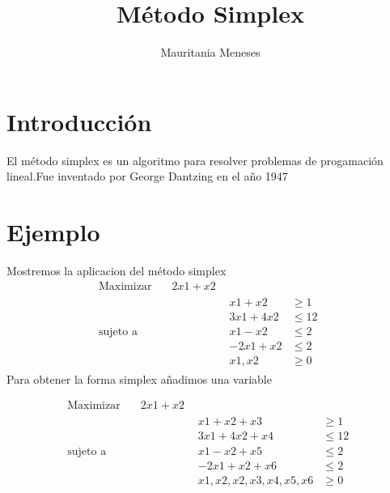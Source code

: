 \documentclass{article}
\title{Método Simplex}
\author{Mauritania Meneses}
\begin{document}
\maketitle

\section{Introducción}
\label{sec:introduccion}

El método simplex es un algoritmo para resolver
problemas de progamación lineal.Fue inventado por George Dantzing en
el año 1947
\section{Ejemplo}

\label{sec:ejemplo}
Mostremos la aplicacion del método simplex
\begin{equation*}
  \begin{aligned}
    \text{Maximizar} \quad & 2x1+x2\\
    
    \text{sujeto a}\quad &
    
    \quad & \begin{aligned}
     x1+x2 & \geq 1\\  
     3x1+4x2 &\leq 12\\
     x1-x2 &\leq 2\\
     -2x1+x2&\leq 2\\
      
      x1,x2 &\geq 0
    \end{aligned}
  \end{aligned}
\end{equation*}
Para obtener la forma simplex añadimos una variable

\begin{equation*}
  \begin{aligned}
    \text{Maximizar} \quad & 2x1+x2\\
    
    \text{sujeto a}\quad &
    
    \quad & \begin{aligned}
     x1+x2+x3 & \geq 1\\  
     3x1+4x2+x4 &\leq 12\\
     x1-x2+x5 &\leq 2\\
     -2x1+x2+x6&\leq 2\\
     x1,x2,x2,x3,x4,x5,x6 &\geq 0
    \end{aligned}
  \end{aligned}
\end{equation*}
\end{document}

